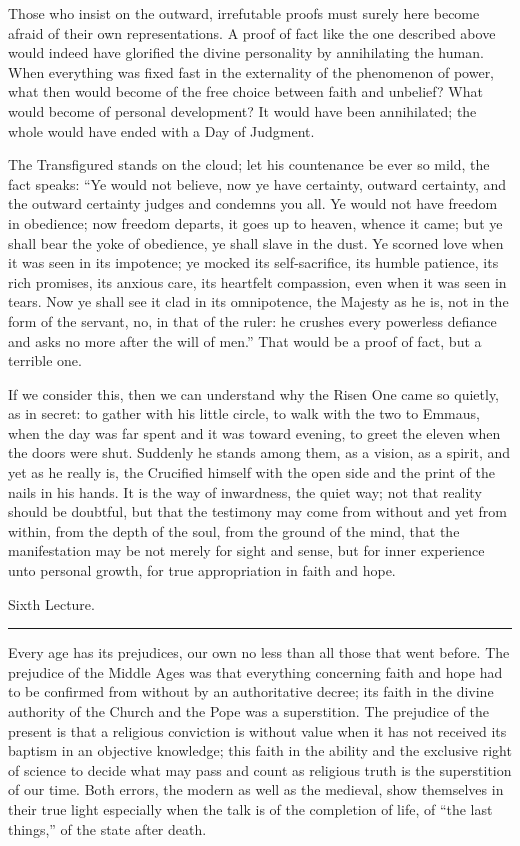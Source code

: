\documentclass[12pt,a4paper,openany]{book}
\newcommand{\opage}[1]{\marginnote{\footnotesize\textit{[#1]}}}
\newcommand{\lecture}[1]{\clearpage\phantomsection\addcontentsline{toc}{chapter}{#1}\begin{center}{\large #1}\\[0.4em]\rule{3em}{0.4pt}\end{center}\medskip\noindent}
\begin{document}
Those who insist on the outward, irrefutable proofs must surely here become afraid of their own
representations. A proof of fact like the one described above would indeed have glorified the divine
personality by annihilating the human. When everything was fixed fast in the externality of the
phenomenon of power, what then would become of the free choice between faith and unbelief? What would
become of personal development? It would have been annihilated; the whole would have ended with a Day of
Judgment.

The Transfigured stands on the cloud; let his countenance be ever so mild, the fact speaks: ``Ye would
not believe, now ye have certainty, outward certainty, and the outward certainty judges and condemns you
all. Ye would
\setcounter{footnote}{0}%
\opage{86}not have freedom in obedience; now freedom departs, it goes up to heaven, whence it came; but
ye shall bear the yoke of obedience, ye shall slave in the dust. Ye scorned love when it was seen in its
impotence; ye mocked its self-sacrifice, its humble patience, its rich promises, its anxious care, its
heartfelt compassion, even when it was seen in tears. Now ye shall see it clad in its omnipotence, the
Majesty as he is, not in the form of the servant, no, in that of the ruler: he crushes every powerless
defiance and asks no more after the will of men.'' That would be a proof of fact, but a terrible one.

If we consider this, then we can understand why the Risen One came so quietly, as in secret: to gather
with his little circle, to walk with the two to Emmaus, when the day was far spent and it was toward
evening, to greet the eleven when the doors were shut. Suddenly he stands among them, as a vision, as a
spirit, and yet as he really is, the Crucified himself with the open side and the print of the nails in
his hands. It is the way of inwardness, the quiet way; not that reality should be doubtful, but that the
testimony may come from without and yet from within, from the depth of the soul, from the ground of the
mind, that the manifestation may be not merely for sight and sense, but for inner experience unto
personal growth, for true appropriation in faith and hope.

\setcounter{footnote}{0}%
\lecture{Sixth Lecture.}\opage{87}Every age has its prejudices, our own no less than all those that went before. The prejudice
of the Middle Ages was that everything concerning faith and hope had to be confirmed from without by an authoritative
decree; its faith in the divine authority of the Church and the Pope was a superstition. The prejudice of the present
is that a religious conviction is without value when it has not received its baptism in an objective knowledge; this
faith in the ability and the exclusive right of science to decide what may pass and count as religious truth is the
superstition of our time. Both errors, the modern as well as the medieval, show themselves in their true light
especially when the talk is of the completion of life, of ``the last things,'' of the state after death.
\end{document}
